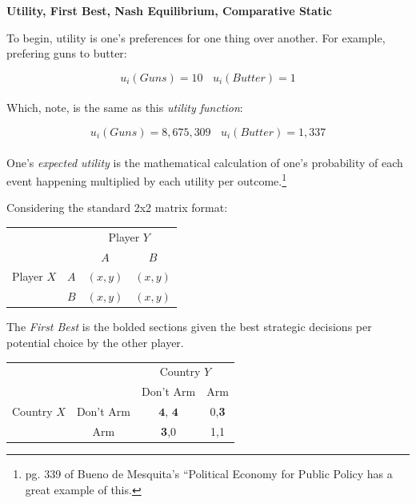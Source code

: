 \documentclass[12pt]{article}\usepackage[]{graphicx}\usepackage[]{color}
\begin{document}
\begin{flushleft}
\noindent \textbf{Utility, First Best, Nash Equilibrium, Comparative Static}

\noindent To begin, utility is one's preferences for one thing over another. For example, prefering guns to butter:

$$ u_i(\textit{Guns}) = 10 ~~~~ u_i(\textit{Butter}) = 1 $$\\

\noindent Which, note, is the same as this \textit{utility function}:

$$ u_i(\textit{Guns}) = 8,675,309 ~~~~ u_i(\textit{Butter}) = 1,337 $$\\

One's \textit{expected utility} is the mathematical calculation of one's probability of each event happening multiplied by each utility per outcome.\footnote{pg. 339 of Bueno de Mesquita's ``Political Economy for Public Policy has a great example of this. }

 
\noindent Considering the standard 2x2 matrix format:

  \begin{table}[h!]
  \centering
    \setlength{\extrarowheight}{2pt}
    \begin{tabular}{cc|c|c|}
      & \multicolumn{1}{c}{} & \multicolumn{2}{c}{Player $Y$}\\
      & \multicolumn{1}{c}{} & \multicolumn{1}{c}{$A$}  & \multicolumn{1}{c}{$B$} \\\cline{3-4}
      {Player $X$}  & $A$ & $(x,y)$ & $(x,y)$ \\\cline{3-4} %
      & $B$ & $(x,y)$ & $(x,y)$ \\\cline{3-4}
    \end{tabular}
  \end{table}

The \textit{First Best} is the bolded sections given the best strategic decisions per potential choice by the other player.


  \begin{table}[h!] %
  \centering        %
    \setlength{\extrarowheight}{2pt}
    \begin{tabular}{cc|c|c|}
      & \multicolumn{1}{c}{} & \multicolumn{2}{c}{Country $Y$}\\
      & \multicolumn{1}{c}{} & \multicolumn{1}{c}{Don't Arm}  & \multicolumn{1}{c}{Arm} \\\cline{3-4}
      {Country $X$}  & Don't Arm & $\textbf{4, 4} $ & 0,\textbf{3} \\\cline{3-4}
      & Arm & \textbf{3},0 & 1,1 \\\cline{3-4}
    \end{tabular}
  \end{table}


\end{flushleft}
\end{document}
